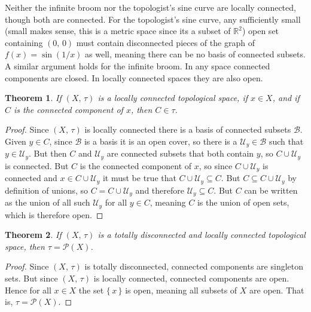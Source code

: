 \documentclass{article}
\theoremstyle{plain}
\newtheorem{theorem}{Theorem}[section]
\theoremstyle{normal}
\newenvironment{example}{%
    \pushQED{\qed}\renewcommand{\qedsymbol}{$\blacksquare$}\examplex%
}{%
    \popQED\endexamplex%
}
\begin{document}
        \begin{example}
            Neither the infinite broom nor the topologist's sine curve are
            locally connected, though both are connected. For the topologist's
            sine curve, any sufficiently small (small makes sense, this is a
            metric space since its a subset of $\mathbb{R}^{2}$) open set
            containing $(0,\,0)$ must contain disconnected pieces of the graph
            of $f(x)=\sin(1/x)$ as well, meaning there can be no basis of
            connected subsets. A similar argument holds for the infinite broom.
        \end{example}
        In any space connected components are closed. In locally connected
        spaces they are also open.
        \begin{theorem}
            If $(X,\,\tau)$ is a locally connected topological space, if
            $x\in{X}$, and if $C$ is the connected component of $x$, then
            $C\in\tau$.
        \end{theorem}
        \begin{proof}
            Since $(X,\,\tau)$ is locally connected there is a basis of
            connected subsets $\mathcal{B}$. Given $y\in{C}$, since
            $\mathcal{B}$ is a basis it is an open cover, so there is a
            $\mathcal{U}_{y}\in\mathcal{B}$ such that $y\in\mathcal{U}_{y}$.
            But then $C$ and $\mathcal{U}_{y}$ are connected subsets that both
            contain $y$, so $C\cup\mathcal{U}_{y}$ is connected. But $C$ is
            the connected component of $x$, so since $C\cup\mathcal{U}_{y}$ is
            connected and $x\in{C}\cup\mathcal{U}_{y}$ it must be true that
            $C\cup\mathcal{U}_{y}\subseteq{C}$. But
            $C\subseteq{C}\cup\mathcal{U}_{y}$ by definition of unions, so
            $C=C\cup\mathcal{U}_{y}$ and therefore
            $\mathcal{U}_{y}\subseteq{C}$. But $C$ can be written as the
            union of all such $\mathcal{U}_{y}$ for all $y\in{C}$, meaning
            $C$ is the union of open sets, which is therefore open.
        \end{proof}
        \begin{theorem}
            If $(X,\,\tau)$ is a totally disconnected and locally connected
            topological space, then $\tau=\mathcal{P}(X)$.
        \end{theorem}
        \begin{proof}
            Since $(X,\,\tau)$ is totally disconnected, connected components
            are singleton sets. But since $(X,\,\tau)$ is locally connected,
            connected components are open. Hence for all $x\in{X}$ the set
            $\{\,x\,\}$ is open, meaning all subsets of $X$ are open. That is,
            $\tau=\mathcal{P}(X)$.
        \end{proof}
\end{document}
